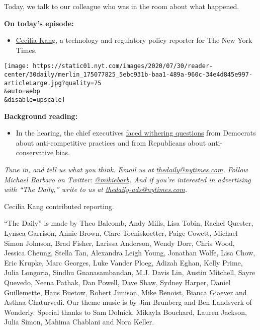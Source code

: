 Today, we talk to our colleague who was in the room about what happened.

\textbf{On today's episode:}

\begin{itemize}
\tightlist
\item
  \href{https://www.nytimes.com/by/cecilia-kang}{Cecilia Kang}, a
  technology and regulatory policy reporter for The New York Times.
\end{itemize}

\texttt{[image: https://static01.nyt.com/images/2020/07/30/reader-center/30daily/merlin\_175077825\_5ebc931b-baa1-489a-960c-34e4d845e997-articleLarge.jpg?quality=75\\\&auto=webp\\\&disable=upscale]}

\textbf{Background reading:}

\begin{itemize}
\tightlist
\item
  In the hearing, the chief executives
  \href{https://www.nytimes.com/2020/07/29/technology/big-tech-hearing-apple-amazon-facebook-google.html}{faced
  withering questions} from Democrats about anti-competitive practices
  and from Republicans about anti-conservative bias.
\end{itemize}

\emph{Tune in, and tell us what you think. Email us at}
\href{mailto:thedaily@nytimes.com}{\emph{thedaily@nytimes.com}}\emph{.
Follow Michael Barbaro on Twitter:}
\href{https://twitter.com/mikiebarb}{\emph{@mikiebarb}}\emph{. And if
you're interested in advertising with ``The Daily,'' write to us at}
\href{mailto:thedaily-ads@nytimes.com}{\emph{thedaily-ads@nytimes.com}}\emph{.}

Cecilia Kang contributed reporting.

``The Daily'' is made by Theo Balcomb, Andy Mills, Lisa Tobin, Rachel
Quester, Lynsea Garrison, Annie Brown, Clare Toeniskoetter, Paige
Cowett, Michael Simon Johnson, Brad Fisher, Larissa Anderson, Wendy
Dorr, Chris Wood, Jessica Cheung, Stella Tan, Alexandra Leigh Young,
Jonathan Wolfe, Lisa Chow, Eric Krupke, Marc Georges, Luke Vander Ploeg,
Adizah Eghan, Kelly Prime, Julia Longoria, Sindhu Gnanasambandan, M.J.
Davis Lin, Austin Mitchell, Sayre Quevedo, Neena Pathak, Dan Powell,
Dave Shaw, Sydney Harper, Daniel Guillemette, Hans Buetow, Robert
Jimison, Mike Benoist, Bianca Giaever and Asthaa Chaturvedi. Our theme
music is by Jim Brunberg and Ben Landsverk of Wonderly. Special thanks
to Sam Dolnick, Mikayla Bouchard, Lauren Jackson, Julia Simon, Mahima
Chablani and Nora Keller.


